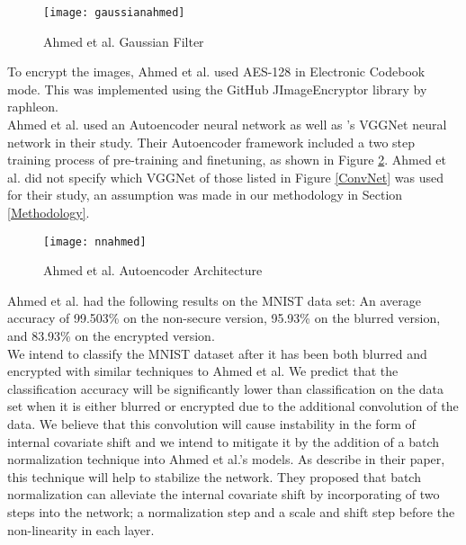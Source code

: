 \documentclass[12pt, titlepage]{article}
\begin{document}
\begin{figure}[h!]
	\begin{center}
		\texttt{[image: gaussianahmed]}
		\caption{Ahmed et al. Gaussian Filter}
		\label{gaussianahmed}
	\end{center}
\end{figure}

\noindent To encrypt the images, Ahmed et al. used AES-128 in Electronic Codebook mode. This was implemented using the GitHub JImageEncryptor library by raphleon.\\ 

\noindent Ahmed et al. used an Autoencoder neural network as well as \cite{simonyan2014very}'s VGGNet neural network in their study. Their Autoencoder framework included a two step training process of pre-training and finetuning, as shown in Figure \ref{nnahmed}. Ahmed et al. did not specify which VGGNet of those listed in Figure \ref{ConvNet} was used for their study, an assumption was made in our methodology in Section \ref{Methodology}.\\

\begin{figure}[h!]
	\begin{center}
		\texttt{[image: nnahmed]}
		\caption{Ahmed et al. Autoencoder Architecture}
		\label{nnahmed}
	\end{center}
\end{figure}

\noindent Ahmed et al. had the following results on the MNIST data set: An average accuracy of 99.503\% on the non-secure version, 95.93\% on the blurred version, and 83.93\% on the encrypted version.\\

\noindent We intend to classify the MNIST dataset after it has been both blurred and encrypted with similar techniques to Ahmed et al. We predict that the classification accuracy will be significantly lower than classification on the data set when it is either blurred or encrypted due to the additional convolution of the data. We believe that this convolution will cause instability in the form of internal covariate shift and we intend to mitigate it by the addition of a batch normalization technique into Ahmed et al.'s models. As \cite{ioffe2015batch} describe in their paper, this technique will help to stabilize the network. They proposed that batch normalization can alleviate the internal covariate shift by incorporating of two steps into the network; a normalization step and a scale and shift step before the non-linearity in each layer.\\
\end{document}
